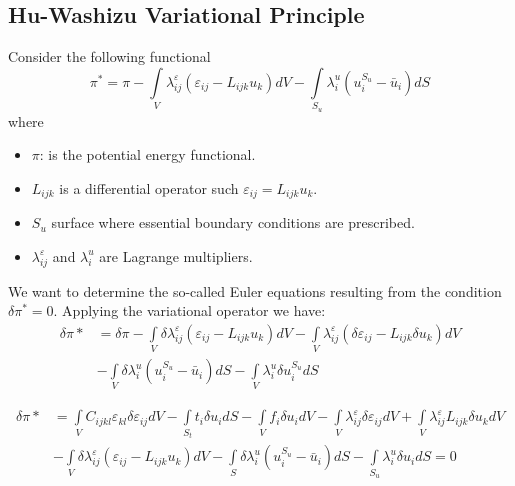 \subsection{Hu-Washizu Variational Principle}
Consider the following functional
\begin{equation}
{\pi ^*} = \pi  - \int\limits_V {\lambda _{ij}^\varepsilon ({\varepsilon _{ij}} - {L_{ijk}}{u_k})dV}  - \int\limits_{{S_u}} {\lambda _i^u(u_i^{{S_u}} - {{\bar u}_i})dS}
\label{eq:Hu}
\end{equation}
where
\begin{itemize}
\item $\pi$: is the potential energy functional.
\item $L_{ijk}$ is a differential operator such ${\varepsilon _{ij}} = {L_{ijk}}{u_k}$.
\item $S_u$ surface where essential boundary conditions are prescribed.
\item $\lambda _{ij}^\varepsilon $ and ${\lambda _i^u}$ are Lagrange multipliers.
\end{itemize}

We want to determine the so-called Euler equations resulting from the condition $\delta \pi^* = 0$. Applying the variational operator we have:
\begin{equation}
\begin{aligned}
\delta \pi *& = \delta \pi  - \int\limits_V {\delta \lambda _{ij}^\varepsilon } ({\varepsilon _{ij}} - {L_{ijk}}{u_k})dV- \int\limits_V {\lambda _{ij}^\varepsilon } (\delta {\varepsilon _{ij}} - {L_{ijk}}\delta {u_k})dV \\
&-\int\limits_V {\delta \lambda _i^u} (u_i^{{S_u}} - {\bar u_i})dS - \int\limits_V {\lambda _i^u} \delta u_i^{{S_u}}dS
\end{aligned}
\end{equation}

\begin{equation}
\begin{aligned}
\delta \pi * &= \int\limits_V {{C_{ijkl}}{\varepsilon _{kl}}\delta {\varepsilon _{ij}}dV - \int\limits_{{S_t}} {{t_i}\delta {u_i}dS}  - \int\limits_V {{f_i}\delta {u_i}dV - } }\int\limits_V {\lambda _{ij}^\varepsilon \delta {\varepsilon _{ij}}dV}  + \int\limits_V {\lambda _{ij}^\varepsilon {L_{ijk}}\delta {u_k}dV}\\
&- \int\limits_V {\delta \lambda _{ij}^\varepsilon ({\varepsilon _{ij}} - {L_{ijk}}{u_k})dV - \int\limits_S {\delta \lambda _i^u(u_i^{{S_u}} - {{\bar u}_i})dS - \int\limits_{{S_u}} {\lambda _i^u\delta {u_i}dS = 0} } }
\end{aligned}
\end{equation}

